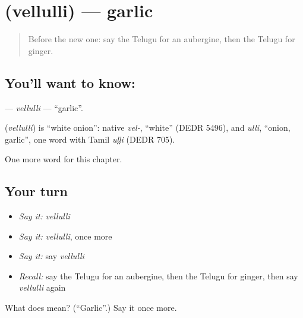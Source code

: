 \section[\texorpdfstring{\te{వెల్లుల్లి} (vellulli)}{వెల్లుల్లి (vellulli)}]{ (vellulli) — garlic}

\label{lesson:TE-C118-vellulli}



\begin{quote}
Before the new one: say the Telugu for an aubergine, then the Telugu for ginger.
\end{quote}

\subsection*{You'll want to know: }
\textbf{} — \emph{vellulli} — \textquotedblleft{}garlic\textquotedblright{}.

\begin{cousinweb}
\textbf{} (\emph{vellulli}) is \textquotedblleft{}white onion\textquotedblright{}: native \emph{vel-}, \textquotedblleft{}white\textquotedblright{} (DEDR 5496), and \emph{ulli}, \textquotedblleft{}onion, garlic\textquotedblright{}, one word with Tamil \emph{uḷḷi} (DEDR 705).
\end{cousinweb}

\begin{grammarlens}[title={What you've built}]
One more word for this chapter.
\end{grammarlens}

\subsection*{Your turn}
\begin{itemize}
\raggedright
  \item \emph{Say it:} \emph{vellulli}
  \item \emph{Say it:} \emph{vellulli}, once more
  \item \emph{Say it:} say \emph{vellulli}
  \item \emph{Recall:} say the Telugu for an aubergine, then the Telugu for ginger, then say \emph{vellulli} again
\end{itemize}

\begin{tcolorbox}[breakable,colback=teal!4,colframe=teal!35!black,title={Before you move on}]
What does  mean? (\textquotedblleft{}Garlic\textquotedblright{}.) Say it once more.
\end{tcolorbox}
